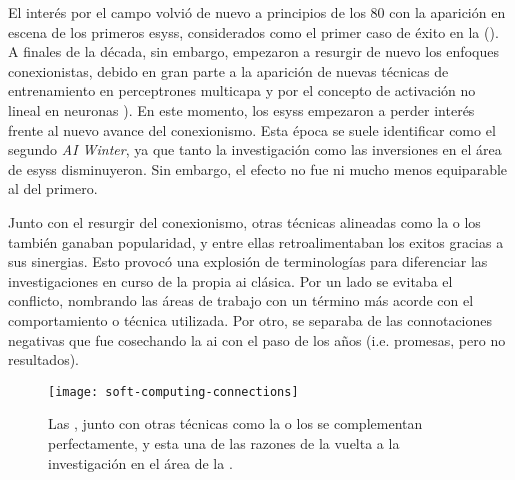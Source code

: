 El interés por el campo volvió de nuevo a principios de los $80$ con la aparición en escena de los primeros \glspl{esys}, considerados como el primer caso de éxito en la  (\cite{russell2003artificial}). A finales de la década, sin embargo, empezaron a resurgir de nuevo los enfoques conexionistas, debido en gran parte a la aparición de nuevas técnicas de entrenamiento en perceptrones multicapa y por el concepto de activación no lineal en neuronas \cite{rumelhart1985learning, cybenko1989approximation}). En este momento, los \glspl{esys} empezaron a perder interés frente al nuevo avance del conexionismo. Esta época se suele identificar como el segundo \textit{AI Winter}, ya que tanto la investigación como las inversiones en el área de \glspl{esys} disminuyeron. Sin embargo, el efecto no fue ni mucho menos equiparable al del primero.

Junto con el resurgir del conexionismo, otras técnicas alineadas como la  o los  también ganaban popularidad, y entre ellas retroalimentaban los exitos gracias a sus sinergias. Esto provocó una explosión de terminologías para diferenciar las investigaciones en curso de la propia \gls{ai} clásica. Por un lado se evitaba el conflicto, nombrando las áreas de trabajo con un término más acorde con el comportamiento o técnica utilizada. Por otro, se separaba de las connotaciones negativas que fue cosechando la \gls{ai} con el paso de los años (i.e. promesas, pero no resultados).

\begin{figure}[!b]
	\texttt{[image: soft-computing-connections]}
	\caption[Sinergias entre técnicas del \gls{sc}]{Las , junto con otras técnicas como la  o los  se complementan perfectamente, y esta una de las razones de la vuelta a la investigación en el área de la .}
	\label{fig:soft-computing-connections}
\end{figure}

